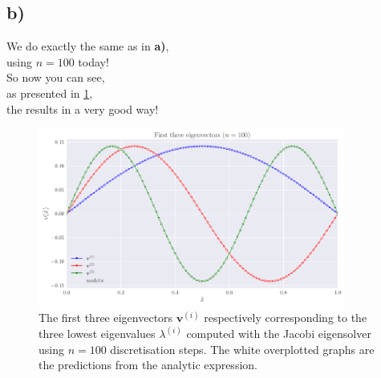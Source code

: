 \documentclass[english,notitlepage,nofootinbib]{revtex4-1}  %
\renewcommand{\vec}{\mathbf}
\begin{document}
\subsection*{b)}
\begin{centering}
We do exactly the same as in \textbf{a)},\\
using $n=100$ today! \\
So now you can see, \\
as presented in \ref{fig:p6_solution100steps},\\
the results in a very good way!\\
\end{centering}

\begin{figure}[h!]
    \centering
    \includegraphics[width=0.9\textwidth]{solution_100steps.pdf}
    \caption{The first three eigenvectors $\vec{v}^{(i)}$ respectively corresponding to the three lowest eigenvalues $\lambda^{(i)}$ computed with the Jacobi eigensolver using $n=100$ discretisation steps. The white overplotted graphs are the predictions from the analytic expression.}\label{fig:p6_solution100steps}
\end{figure}

   
\end{document}

